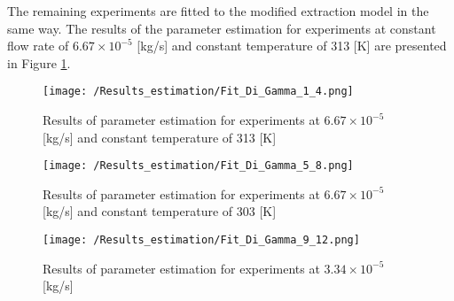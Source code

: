 \documentclass[../Supercritical_fluid_extraction_of_essential_oil_from_chamomile.tex]{subfiles}
\begin{document}
	The remaining experiments are fitted to the modified extraction model in the same way. The results of the parameter estimation for experiments at constant flow rate of $6.67\times 10^{-5}$ [kg/s] and constant temperature of 313 [K] are presented in Figure \ref{fig: Fit_1_4_Di_Dx}.
	
	\begin{figure}[!h]
		\centering
		\texttt{[image: /Results\_estimation/Fit\_Di\_Gamma\_1\_4.png]}
		\caption{Results of parameter estimation for experiments at $6.67\times 10^{-5}$ [kg/s] and constant temperature of 313 [K]}
		\label{fig: Fit_1_4_Di_Dx}
	\end{figure}
	
	\begin{figure}[!h]
		\centering
		\texttt{[image: /Results\_estimation/Fit\_Di\_Gamma\_5\_8.png]}
		\caption{Results of parameter estimation for experiments at $6.67\times 10^{-5}$ [kg/s] and constant temperature of 303 [K]}
		\label{fig: Fit_5_8_Di_Dx}
	\end{figure}
	
	\begin{figure}[!h]
		\centering
		\texttt{[image: /Results\_estimation/Fit\_Di\_Gamma\_9\_12.png]}
		\caption{Results of parameter estimation for experiments at $3.34\times 10^{-5}$ [kg/s]}
		\label{fig: Fit_9_12_Di_Dx}
	\end{figure}
	
\end{document}
